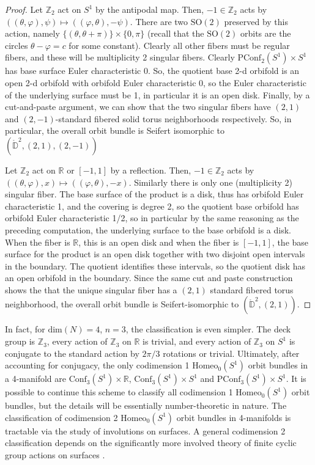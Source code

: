 \documentclass[10pt, oneside]{article}
\newcommand{\R}{\mathbb{R}}
\newcommand{\Z}{\mathbb{Z}}
\newcommand{\SO}[1][2]{\text{SO}(#1)}
\newcommand{\homeo}[1][S^1]{\text{Homeo}_0(#1)}
\newcommand{\conf}[2][S^1]{\text{Conf}_{#2}(#1)}
\newcommand{\pconf}[2][S^1]{\text{PConf}_{#2}(#1)}
\theoremstyle{definition}
\theoremstyle{definition}
\begin{document}
\begin{proof}
    Let $\Z_2$ act on $S^1$ by the antipodal map. Then, $-1\in\Z_2$\improve{introduce using $\Z_2 =\{-1, 1\}$} acts by $((\theta, \varphi), \psi)\mapsto ((\varphi, \theta), -\psi)$. There are two $\SO$ preserved by this action, namely $\{(\theta, \theta + \pi)\}\times \{0, \pi\}$ (recall that the $\SO$ orbits are the circles $\theta-\varphi = c$ for some constant). Clearly all other fibers must be regular fibers, and these will be multiplicity 2 singular fibers. Clearly $\pconf{2}\times S^1$ has base surface Euler characteristic 0. So, the quotient base 2-d orbifold is an open 2-d orbifold with orbifold Euler characteristic 0, so the Euler characteristic of the underlying surface must be 1, in particular it is an open disk. Finally, by a cut-and-paste argument, we can show that the two singular fibers have $(2, 1)$ and $(2,-1)$-standard fibered solid torus neighborhoods respectively. So, in particular, the overall orbit bundle is Seifert isomorphic to $(\mathring{\mathbb{D}}^2, (2, 1), (2,-1))$

    Let $\Z_2$ act on $\R$ or $[-1, 1]$ by a reflection. Then, $-1\in\Z_2$ acts by $((\theta, \varphi), x)\mapsto ((\varphi, \theta), -x)$. Similarly there is only one (multiplicity 2) singular fiber. The base surface of the product is a disk, thus has orbifold Euler characteristic 1, and the covering is degree 2, so the quotient base orbifold has orbifold Euler characteristic 1/2, so in particular by the same reasoning as the preceding computation, the underlying surface to the base orbifold is a disk. When the fiber is $\R$, this is an open disk and when the fiber is $[-1,1]$, the base surface for the product is an open disk together with two disjoint open intervals in the boundary. The quotient identifies these intervals, so the quotient disk has an open orbifold in the boundary. Since the same cut and paste construction shows the that the unique singular fiber has a $(2,1)$ standard fibered torus neighborhood, the overall orbit bundle is Seifert-isomorphic to $(\mathring{\mathbb{D}}^2, (2, 1))$.
\end{proof}

 In fact, for $\text{dim}(N) = 4$, $n=3$, the classification is even simpler. The deck group is $\Z_3$, every action of $\Z_3$ on $\R$ is trivial, and every action of $\Z_3$ on $S^1$ is conjugate to the standard action by $2\pi/3$ rotations or trivial. Ultimately, after accounting for conjugacy, the only codimension 1 $\homeo$ orbit bundles in a 4-manifold are $\conf[S^1]{3}\times \R$, $\conf[S^1]{3}\times S^1$ and $\pconf[S^1]{3}\times S^1$. It is possible to continue this scheme to classify all codimension 1 $\homeo$ orbit bundles, but the details will be essentially number-theoretic in nature. The classification of codimension 2 $\homeo$ orbit bundles in 4-manifolds is tractable via the study of involutions on surfaces\cite{dugger:InvolutionsSurfaces}. A general codimension 2 classification depends on the significantly more involved theory of finite cyclic group actions on surfaces \cite{harvey:CyclicGroups}\cite{ding:ClassificationCyclic}.
\end{document}
